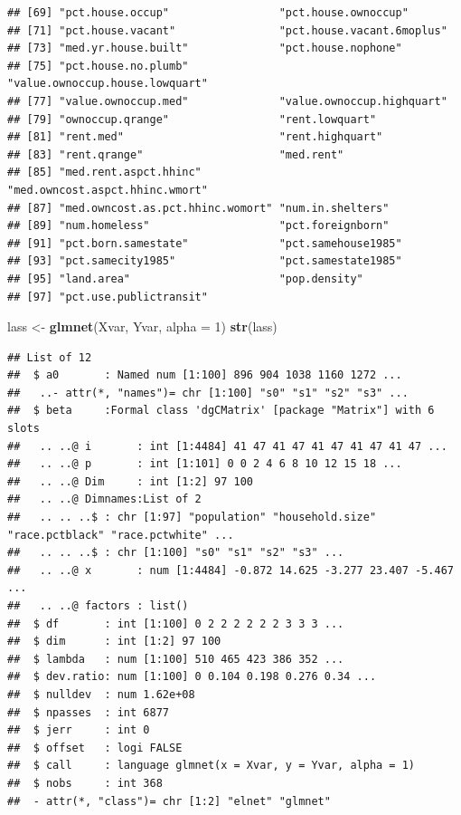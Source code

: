 \documentclass[]{article}
\newenvironment{Shaded}{\begin{snugshade}}{\end{snugshade}}
\newcommand{\KeywordTok}[1]{\textcolor[rgb]{0.13,0.29,0.53}{\textbf{#1}}}
\newcommand{\DataTypeTok}[1]{\textcolor[rgb]{0.13,0.29,0.53}{#1}}
\newcommand{\DecValTok}[1]{\textcolor[rgb]{0.00,0.00,0.81}{#1}}
\newcommand{\StringTok}[1]{\textcolor[rgb]{0.31,0.60,0.02}{#1}}
\newcommand{\NormalTok}[1]{#1}
\begin{document}
\begin{verbatim}
## [69] "pct.house.occup"                 "pct.house.ownoccup"             
## [71] "pct.house.vacant"                "pct.house.vacant.6moplus"       
## [73] "med.yr.house.built"              "pct.house.nophone"              
## [75] "pct.house.no.plumb"              "value.ownoccup.house.lowquart"  
## [77] "value.ownoccup.med"              "value.ownoccup.highquart"       
## [79] "ownoccup.qrange"                 "rent.lowquart"                  
## [81] "rent.med"                        "rent.highquart"                 
## [83] "rent.qrange"                     "med.rent"                       
## [85] "med.rent.aspct.hhinc"            "med.owncost.aspct.hhinc.wmort"  
## [87] "med.owncost.as.pct.hhinc.womort" "num.in.shelters"                
## [89] "num.homeless"                    "pct.foreignborn"                
## [91] "pct.born.samestate"              "pct.samehouse1985"              
## [93] "pct.samecity1985"                "pct.samestate1985"              
## [95] "land.area"                       "pop.density"                    
## [97] "pct.use.publictransit"
\end{verbatim}

\begin{Shaded}
\begin{Highlighting}[]
\NormalTok{lass <-}\StringTok{ }\KeywordTok{glmnet}\NormalTok{(Xvar, Yvar, }\DataTypeTok{alpha =} \DecValTok{1}\NormalTok{) }
\KeywordTok{str}\NormalTok{(lass)}
\end{Highlighting}
\end{Shaded}

\begin{verbatim}
## List of 12
##  $ a0       : Named num [1:100] 896 904 1038 1160 1272 ...
##   ..- attr(*, "names")= chr [1:100] "s0" "s1" "s2" "s3" ...
##  $ beta     :Formal class 'dgCMatrix' [package "Matrix"] with 6 slots
##   .. ..@ i       : int [1:4484] 41 47 41 47 41 47 41 47 41 47 ...
##   .. ..@ p       : int [1:101] 0 0 2 4 6 8 10 12 15 18 ...
##   .. ..@ Dim     : int [1:2] 97 100
##   .. ..@ Dimnames:List of 2
##   .. .. ..$ : chr [1:97] "population" "household.size" "race.pctblack" "race.pctwhite" ...
##   .. .. ..$ : chr [1:100] "s0" "s1" "s2" "s3" ...
##   .. ..@ x       : num [1:4484] -0.872 14.625 -3.277 23.407 -5.467 ...
##   .. ..@ factors : list()
##  $ df       : int [1:100] 0 2 2 2 2 2 2 3 3 3 ...
##  $ dim      : int [1:2] 97 100
##  $ lambda   : num [1:100] 510 465 423 386 352 ...
##  $ dev.ratio: num [1:100] 0 0.104 0.198 0.276 0.34 ...
##  $ nulldev  : num 1.62e+08
##  $ npasses  : int 6877
##  $ jerr     : int 0
##  $ offset   : logi FALSE
##  $ call     : language glmnet(x = Xvar, y = Yvar, alpha = 1)
##  $ nobs     : int 368
##  - attr(*, "class")= chr [1:2] "elnet" "glmnet"
\end{verbatim}
\end{document}
